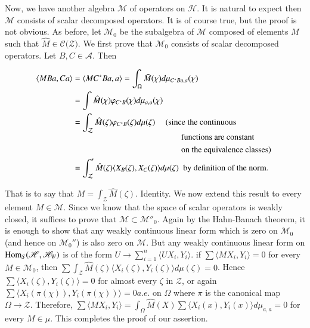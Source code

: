 Now, we have another algebra $\mathscr{M}$ of operators on
$\mathscr{H}$. It is natural to expect then $\mathscr{M}$ consists of scalar
decomposed operators. It 
is of course true, but the proof is not obvious. As before, let
$\mathscr{M}_0$ be the subalgebra of $\mathscr{M}$ composed of
elements $M$ such that $\hat{M} \in \mathscr{C} (\mathcal{Z)}$. We
first prove that $\mathscr{M}_0$ consists of 
scalar decomposed operators. Let $B, C \in \mathcal{A}$.  Then 

\vfill\eject
\begin{align*}
\langle MBa, Ca \rangle & = \langle MC^*Ba, a \rangle = \int_\Omega
\bar{M}(\chi) d \mu_{C^*Ba, a}(\chi)\\ 
& = \int  \hat{M}(\chi) \varphi_{C^*B}(\chi)d\mu_{a,a}(\chi)\\ 
& = \int_{\mathcal{Z}}  \hat{M}(\zeta) \varphi_{C^*B}(\zeta) d
\mu(\zeta )\quad \text{ (since the continuous}\\[-4pt]
&\hspace{4.5cm} \text{ functions are constant}\\
& \hspace{4.5cm}\text{ on the equivalence classes) }\\ 
& = \int_\mathcal{Z}' \hat {M}(\zeta) \langle X_B (\zeta), X_C (\zeta)
\rangle d\mu(\zeta) \; \text { by definition of the norm}.  
\end{align*}

That is to say that $M  = \int_{\mathcal{Z}} \hat{M}(\zeta)$. Identity. 
We\pageoriginale 
now extend this result to every element $M \in \mathscr{M}$. Since we know
that the space of scalar operators is weakly closed, it suffices to
prove that $\mathscr{M}\subset \mathscr{M}''_0$. Again by the
Hahn-Banach theorem, it is enough to 
show that any weakly continuous linear form which is zero on $\mathscr{M}_0$
(and hence on $\mathscr{M}_0''$) is also zero on $\mathscr{M}$. 
But any weakly continuous
linear form on $\operatorname{Hom}_S(\mathscr{H},\mathscr{H}_W)$ is of the form $U
\to \sum\limits^n_{i=1} \langle U X_i, Y_i \rangle$. if  $\sum \langle
MX_i, Y_i \rangle = 0$ for every $M \in \mathscr{M}_0$, then 
$\sum \int_{{\mathcal{Z}}}\hat{M}(\zeta) \langle X_i (\zeta), Y_i
(\zeta) \rangle d\mu (\zeta) = 0$. Hence  
$\sum \langle X_i (\zeta), Y_i (\zeta) \rangle = 0$ for almost every
$\zeta$ in $\mathcal{Z}$, or again $\sum \langle X_i (\pi (\chi)), Y_i
(\pi(\chi))\rangle= 0 a. e. $ on $\Omega$ where $ \pi$ is the
canonical map $\Omega \rightarrow \mathcal{Z}$. Therefore, $\sum
\langle MX_i, Y_i \rangle  
= \int_{\Omega}\hat{M}(X) \sum \langle X_i (x), Y_i (x) \rangle d
\mu_{a, a}= 0$ for every $ M \in \mu$. This completes the proof of our
assertion. 

